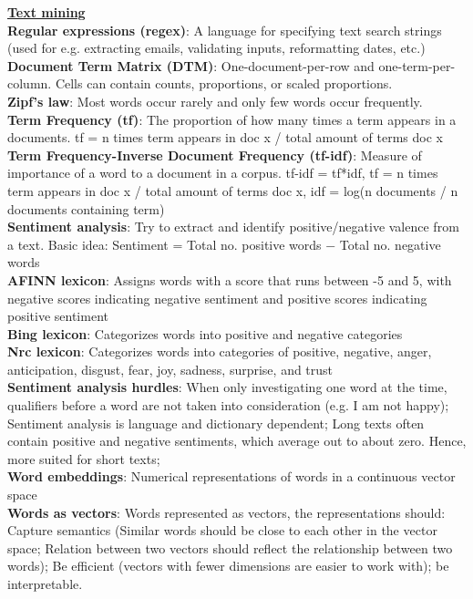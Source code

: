 \documentclass[a4paper,7pt,landscape]{extarticle}
\begin{document}
\begin{multicols}{3}
\begin{boxA}
\underline{\textbf{Text mining}}\\
\textbf{Regular expressions (regex)}: A language for specifying text search strings (used for e.g. extracting emails, validating inputs, reformatting dates, etc.)\\
\textbf{Document Term Matrix (DTM)}: One-document-per-row and one-term-per-column. Cells can contain counts, proportions, or scaled proportions.\\
\textbf{Zipf's law}: Most words occur rarely and only few words occur frequently.\\
\textbf{Term Frequency (tf)}: The proportion of how many times a term appears in a documents. tf = n times term appears in doc x / total amount of terms doc x\\
\textbf{Term Frequency-Inverse Document Frequency (tf-idf)}: Measure of importance of a word to a document in a corpus. tf-idf = tf*idf, tf = n times term appears in doc x / total amount of terms doc x, idf = log(n documents / n documents containing term)\\
\textbf{Sentiment analysis}: Try to extract and identify positive/negative valence from a text. Basic idea: Sentiment = Total no. positive words − Total no. negative words\\
\textbf{AFINN lexicon}: Assigns words with a score that runs between -5 and 5, with negative scores indicating negative sentiment and positive scores indicating positive sentiment\\
\textbf{Bing lexicon}: Categorizes words into positive and negative categories\\
\textbf{Nrc lexicon}: Categorizes words into categories of positive, negative, anger, anticipation, disgust, fear, joy, sadness, surprise, and trust\\
\textbf{Sentiment analysis hurdles}: When only investigating one word at the time, qualifiers before a word are not taken into consideration (e.g. I am not happy); Sentiment analysis is language and dictionary dependent; Long texts often contain positive and negative sentiments, which average out to about zero. Hence, more suited for short texts;\\
\textbf{Word embeddings}: Numerical representations of words in a continuous vector space\\
\textbf{Words as vectors}: Words represented as vectors, the representations should: Capture semantics (Similar words should be close to each other in the vector space; Relation between two vectors should reflect the relationship between two words); Be efficient (vectors with fewer dimensions are easier to work with); be interpretable.\\

\end{boxA}
\end{multicols}
\end{document}
